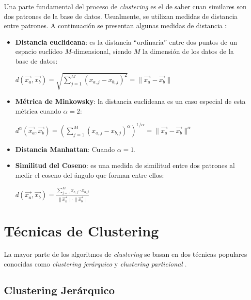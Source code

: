Una parte fundamental del proceso de \emph{clustering} es el de saber cuan
similares son dos patrones de la base de datos. Usualmente, se utilizan medidas
de distancia entre patrones. A continuación se presentan algunas medidas de
distancia \cite{PSO_0}:
\begin{itemize}
    \item \textbf{Distancia euclideana}: es la distancia ``ordinaria'' entre dos
puntos de un espacio euclídeo $M$-dimensional, siendo $M$ la dimensión de los
datos de la base de datos:
\begin{center}
    $d(\overrightarrow{x_a}, \overrightarrow{x_b}) = \displaystyle\sqrt{\displaystyle\sum_{j = 1}^{M} (x_{a,j} - x_{b,j})^2} = \|\overrightarrow{x_a} - \overrightarrow{x_b}\|$
\end{center}
    \item \textbf{Métrica de Minkowsky}: la distancia euclideana es un caso
especial de esta métrica cuando $\alpha = 2$:
\begin{center}
    $d^{\alpha}(\overrightarrow{x_a}, \overrightarrow{x_b}) = \left(\displaystyle\sum_{j = 1}^{M} (x_{a,j} - x_{b,j})^{\alpha}\right)^{1/\alpha} = \|\overrightarrow{x_a} - \overrightarrow{x_b}\|^{\alpha}$
\end{center}
    \item \textbf{Distancia Manhattan}: Cuando $\alpha = 1$. 
    \item \textbf{Similitud del Coseno}: es una medida de similitud entre dos
patrones al medir el coseno del ángulo que forman entre ellos:
\begin{center}
    $d(\overrightarrow{x_a}, \overrightarrow{x_b}) = \displaystyle\frac{\displaystyle\sum_{j = 1}^{M} x_{a, j} \cdot x_{b, j}}{\|\overrightarrow{x_a}\| \cdot \|\overrightarrow{x_b}\|}$
\end{center}
\end{itemize}

\section{Técnicas de Clustering}

    La mayor parte de los algoritmos de \emph{clustering} se basan en dos
técnicas populares conocidas como  \emph{clustering jerárquico} y
\emph{clustering particional} \cite{PSO_0}.

\subsection{Clustering Jerárquico}

